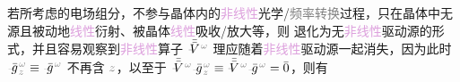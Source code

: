 若所考虑的电场组分，不参与晶体内的\textcolor{Plum}{非线性}\textcolor{NavyBlue}{光学}/\textcolor{gray}{频率转换}过程，只在晶体中\textcolor{NavyBlue}{无源}且\textcolor{NavyBlue}{被动}地\textcolor{Plum}{线性}衍射、被晶体\textcolor{Plum}{线性}\textcolor{NavyBlue}{吸收}/\textcolor{NavyBlue}{放大}等，则  退化为无\textcolor{Plum}{非线性}\textcolor{NavyBlue}{驱动源}的形式，并且容易观察到\textcolor{Plum}{非线性}算子 $\Xint{\mathcolor{gray}{-}}{21}{\bar{\bar{V}}}^{\;\! \mathcolor{gray}{\omega}}$ 理应随着\textcolor{Plum}{非线性}\textcolor{NavyBlue}{驱动源}一起消失，因为此时 $\Xint{{}^{}_{\mathcolor{gray}{-}}}{10}{\bar{g}}^{\;\!\mathcolor{gray}{\omega}}_{\;\! \mathcolor{gray}{z}} \equiv \Xint{{}^{}_{\mathcolor{gray}{-}}}{10}{\bar{g}}^{\;\!\mathcolor{gray}{\omega}}$ 不再含 $\mathcolor{gray}{z}$，以至于 $\Xint{\mathcolor{gray}{-}}{21}{\bar{\bar{V}}}^{\;\! \mathcolor{gray}{\omega}} \Xint{{}^{}_{\mathcolor{gray}{-}}}{10}{\bar{g}}^{\;\!\mathcolor{gray}{\omega}}_{\;\! \mathcolor{gray}{z}} \equiv \Xint{\mathcolor{gray}{-}}{21}{\bar{\bar{V}}}^{\;\! \mathcolor{gray}{\omega}} \Xint{{}^{}_{\mathcolor{gray}{-}}}{10}{\bar{g}}^{\;\!\mathcolor{gray}{\omega}} = \bar{0}$，则有

